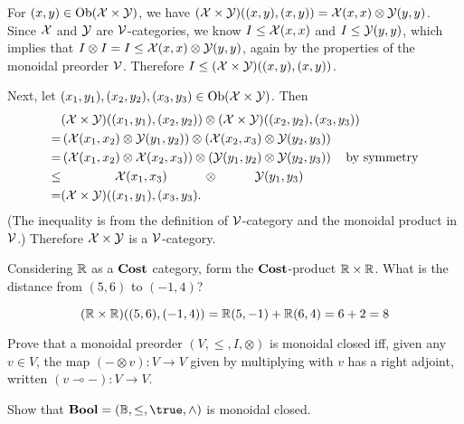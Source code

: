 For $(x,y)\in\textrm{Ob}(\mathcal{X}\times\mathcal{Y})$,  we have $(\mathcal{X}\times\mathcal{Y})((x,y),(x,y))=\mathcal{X}(x,x)\otimes\mathcal{Y}(y,y)$.  Since $\mathcal{X}$ and $\mathcal{Y}$ are $\mathcal{V}$-categories, we know $I\leq\mathcal{X}(x,x)$ and $I\leq\mathcal{Y}(y,y)$, which implies that $I\otimes I=I\leq\mathcal{X}(x,x)\otimes\mathcal{Y}(y,y)$, again by the properties of the monoidal preorder $\mathcal{V}$.  Therefore $I\leq(\mathcal{X}\times\mathcal{Y})((x,y),(x,y))$.

Next, let $(x_1,y_1),(x_2,y_2),(x_3,y_3)\in\textrm{Ob}(\mathcal{X}\times\mathcal{Y})$.  Then
\begin{align*}
	&(\mathcal{X}\times\mathcal{Y})((x_1,y_1),(x_2,y_2))\otimes(\mathcal{X}\times\mathcal{Y})((x_2,y_2),(x_3,y_3))\\ 
	=&\left(\mathcal{X}(x_1,x_2)\otimes\mathcal{Y}(y_1,y_2)\right)\otimes\left(\mathcal{X}(x_2,x_3)\otimes\mathcal{Y}(y_2,y_3)\right)\\
	=&\left(\mathcal{X}(x_1,x_2)\otimes\mathcal{X}(x_2,x_3)\right)\otimes\left(\mathcal{Y}(y_1,y_2)\otimes\mathcal{Y}(y_2,y_3)\right)\quad\textrm{by symmetry}\\
	\leq&\hspace{1.5cm}\mathcal{X}(x_1,x_3)\hspace{1cm}\otimes\hspace{1cm}\mathcal{Y}(y_1,y_3)\\
	=&(\mathcal{X}\times\mathcal{Y})((x_1,y_1),(x_3,y_3).
\end{align*}
(The inequality is from the definition of $\mathcal{V}$-category and the monoidal product in $\mathcal{V}$.)
Therefore $\mathcal{X}\times\mathcal{Y}$ is a $\mathcal{V}$-category.

Considering $\mathbb{R}$ as a $\textbf{Cost}$ category, form the $\textbf{Cost}$-product $\mathbb{R}\times\mathbb{R}$.  What is the distance from $(5,6)$ to $(-1,4)$?

\solution
$$(\mathbb{R}\times\mathbb{R})((5,6),(-1,4)) = \mathbb{R}(5,-1)+\mathbb{R}(6,4)=6+2=8$$

Prove that a monoidal preorder $(V,\leq, I,\otimes)$ is monoidal closed iff, given any $v\in V$, the map $(-\otimes v):V\to V$ given by multiplying with $v$ has a right adjoint, written $(v \multimap-): V \to V$.

\solution

Show that $\Bool=(\B,\leq,\true,\land)$ is monoidal closed.

\solution





